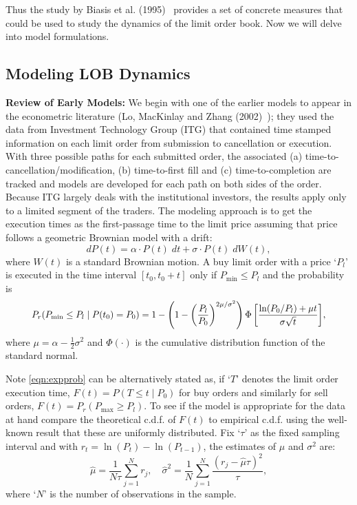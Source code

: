 Thus the study by Biasis et al. (1995)~\cite{spalt} provides a set of concrete measures that could be used to study the dynamics of the limit order book. Now we will delve into model formulations. 


\subsection{Modeling LOB Dynamics}


\noindent\textbf{Review of Early Models:} We begin with one of the earlier models to appear in the econometric literature (Lo, MacKinlay and Zhang (2002)~\cite{maczhang}); they used the data from Investment Technology Group (ITG) that contained time stamped information on each limit order from submission to cancellation or execution. With three possible paths for each submitted order, the associated (a) time-to-cancellation/modification, (b) time-to-first fill and (c) time-to-completion are tracked and models are developed for each path on both sides of the order. Because ITG largely deals with the institutional investors, the results apply only to a limited segment of the traders. The modeling approach is to get the execution times as the first-passage time to the limit price assuming that price follows a geometric Brownian model with a drift:
	\begin{equation} \label{eqn:dp(t)}
	dP(t)= \alpha \cdot P(t) \; dt + \sigma \cdot P(t) \; dW(t),
	\end{equation}
where $W(t)$ is a standard Brownian motion. A buy limit order with a price `$P_l$' is executed in the time interval $[t_0,t_0+t]$ only if $P_{\text{min}} \leq P_l$ and the probability is
	\begin{equation} \label{eqn:expprob}
	\scalebox{0.95}{$P_r(P_{\text{min}} \leq P_l \;|\; P(t_0)=P_0)= 1- \left(1 - \left(\dfrac{P_l}{P_0} \right)^{2\mu/\sigma^2} \right) \Phi\left[ \dfrac{\ln(P_0/P_l) + \mu t}{\sigma \sqrt{t}} \right]$},
	\end{equation}
where $\mu=\alpha - \frac{1}{2} \sigma^2$ and $\Phi(\cdot)$ is the cumulative distribution function of the standard normal. 


Note \eqref{eqn:expprob} can be alternatively stated as, if `$T$' denotes the limit order execution time, $F(t)=P(T \leq t \;|\; P_0)$ for buy orders and similarly for sell orders, $F(t)=P_r(P_{\text{max}} \geq P_l)$. To see if the model is appropriate for the data at hand compare the theoretical c.d.f. of $F(t)$ to empirical c.d.f. using the well-known result that these are uniformly distributed. Fix `$\tau$' as the fixed sampling interval and with $r_t=\ln(P_t)-\ln(P_{t-1})$, the estimates of $\mu$ and $\sigma^2$ are:
	\begin{equation}\label{eqn:sampleestm}
	\hat{\mu}= \dfrac{1}{N\tau} \sum_{j=1}^N r_j, \quad \hat{\sigma}^2= \dfrac{1}{N} \sum_{j=1}^N \dfrac{(r_j - \hat{\mu} \tau)^2}{\tau},
	\end{equation}
where `$N$' is the number of observations in the sample. 


